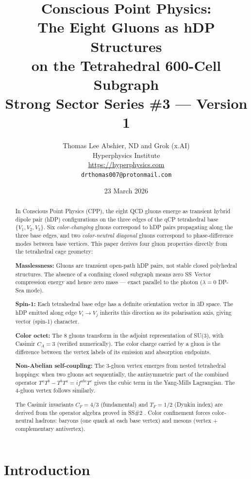 \documentclass[11pt,a4paper]{article}
\title{\textbf{Conscious Point Physics:\\
The Eight Gluons as hDP Structures\\
on the Tetrahedral 600-Cell Subgraph}\\[6pt]
{\large Strong Sector Series \#3 --- Version 1}}
\author{Thomas Lee Abshier, ND and Grok (x.AI)\\
Hyperphysics Institute\\
\url{https://hyperphysics.com}\\
\texttt{drthomas007@protonmail.com}}
\date{23 March 2026}
\begin{document}
\maketitle

\begin{abstract}
In Conscious Point Physics (CPP), the eight QCD gluons emerge as
transient hybrid dipole pair (hDP) configurations on the three edges
of the qCP tetrahedral base $\{V_1, V_2, V_3\}$.  Six
\emph{color-changing} gluons correspond to hDP pairs propagating
along the three base edges, and two \emph{color-neutral diagonal}
gluons correspond to phase-difference modes between base vertices.
This paper derives four gluon properties directly from the
tetrahedral cage geometry:

\textbf{Masslessness:} Gluons are transient open-path hDP pairs,
not stable closed polyhedral structures.  The absence of a
confining closed subgraph means zero SS~Vector compression energy
and hence zero mass --- exact parallel to the photon ($\lambda=0$
DP-Sea mode).

\textbf{Spin-1:} Each tetrahedral base edge has a definite
orientation vector in 3D space.  The hDP emitted along edge
$V_i \to V_j$ inherits this direction as its polarisation axis,
giving vector (spin-1) character.

\textbf{Color octet:} The 8 gluons transform in the adjoint
representation of SU(3), with Casimir $C_A = 3$ (verified
numerically).  The color charge carried by a gluon is the
difference between the vertex labels of its emission and
absorption endpoints.

\textbf{Non-Abelian self-coupling:} The 3-gluon vertex emerges
from nested tetrahedral hoppings: when two gluons act
sequentially, the antisymmetric part of the combined operator
$T^aT^b - T^bT^a = if^{abc}T^c$ gives the cubic term in the
Yang-Mills Lagrangian.  The 4-gluon vertex follows similarly.

The Casimir invariants $C_F = 4/3$ (fundamental) and $T_F = 1/2$
(Dynkin index) are derived from the operator algebra proved in
SS\#2 \citep{cpp_ss2}.  Color confinement forces color-neutral
hadrons: baryons (one quark at each base vertex) and mesons
(vertex + complementary antivertex).
\end{abstract}

\tableofcontents
\newpage

\section{Introduction}
\end{document}
